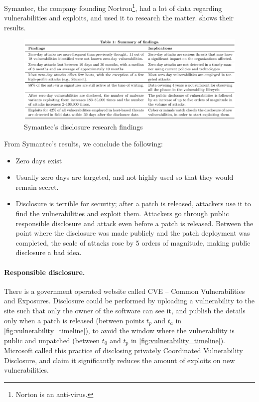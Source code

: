 Symantec, the company founding Nortron\footnote{Norton is an anti-virus.}, had a
lot of data regarding vulnerabilities and exploits, and used it to research the
matter.  shows their results.

\begin{figure}[!ht]
    \centering
    \includegraphics[width=\textwidth]{images/Disclosure_Research_Findings.PNG}
    \caption{Symantec's disclosure research findings} \label{fig:disclosure_research_findings}
\end{figure}

From Symantec's results, we conclude the following:

\begin{itemize}
    \item Zero days exist
    \item Usually zero days are targeted, and not highly used so that they would
    remain secret.
    \item Disclosure is terrible for security; after a patch is released,
    attackers use it to find the vulnerabilities and exploit them. Attackers go
    through public responsible disclosure and attack even before a patch is
    released. Between the point where the disclosure was made publicly and the
    patch deployment was completed, the scale of attacks rose by 5 orders of
    magnitude, making public disclosure a bad idea.
\end{itemize}

\paragraph{Responsible disclosure.} There is a government operated website
called CVE – Common Vulnerabilities and Exposures. Disclosure could be performed
by uploading a vulnerability to the site such that only the owner of the
software can see it, and publish the details only when a patch is released
(between points $t_p$ and $t_a$ in \cref{fig:vulnerability_timeline}), to avoid
the window where the vulnerability is public and unpatched (between $t_0$ and
$t_p$ in \cref{fig:vulnerability_timeline}). Microsoft called this practice of
disclosing privately Coordinated Vulnerability Disclosure, and claim it
significantly reduces the amount of exploits on new vulnerabilities\cite{CVD}.

